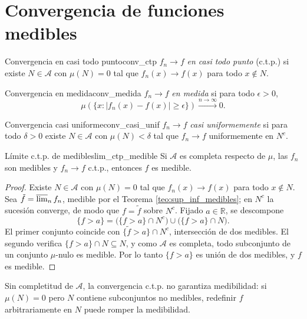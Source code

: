 \documentclass[11pt, a4paper]{article}
\begin{document}
\newpage

\section{Convergencia de funciones medibles}

\begin{definicion}{Convergencia en casi todo punto}{conv_ctp}
$f_n \to f$ \emph{en casi todo punto} (c.t.p.) si existe $N \in \mathcal{A}$ con
$\mu(N) = 0$ tal que $f_n(x) \to f(x)$ para todo $x \notin N$.
\end{definicion}

\begin{definicion}{Convergencia en medida}{conv_medida}
$f_n \to f$ \emph{en medida} si para todo $\epsilon > 0$,
$$ \mu(\{x : |f_n(x) - f(x)| \ge \epsilon\}) \xrightarrow{n \to \infty} 0. $$
\end{definicion}

\begin{definicion}{Convergencia casi uniforme}{conv_casi_unif}
$f_n \to f$ \emph{casi uniformemente} si para todo $\delta > 0$ existe $N \in \mathcal{A}$ con
$\mu(N) < \delta$ tal que $f_n \to f$ uniformemente en $N^c$.
\end{definicion}

\begin{corolario}{Límite c.t.p. de medibles}{lim_ctp_medible}
Si $\mathcal{A}$ es completa respecto de $\mu$, las $f_n$ son medibles y $f_n \to f$ c.t.p.,
entonces $f$ es medible.
\end{corolario}

\begin{proof}
Existe $N \in \mathcal{A}$ con $\mu(N) = 0$ tal que $f_n(x) \to f(x)$ para todo $x \notin N$. Sea
$\tilde f = \varlimsup_n f_n$, medible por el Teorema \ref{teo:sup_inf_medibles}; en $N^c$ la
sucesión converge, de modo que $f = \tilde f$ sobre $N^c$. Fijado $a \in \mathbb{R}$, se descompone
$$ \{f > a\} = \big(\{f > a\} \cap N^c\big) \cup \big(\{f > a\} \cap N\big). $$
El primer conjunto coincide con $\{\tilde f > a\} \cap N^c$, intersección de dos medibles. El
segundo verifica $\{f > a\} \cap N \subseteq N$, y como $\mathcal{A}$ es completa, todo subconjunto
de un conjunto $\mu$-nulo es medible. Por lo tanto $\{f > a\}$ es unión de dos medibles, y $f$ es
medible.
\end{proof}

\obs Sin completitud de $\mathcal{A}$, la convergencia c.t.p. no garantiza medibilidad: si
$\mu(N) = 0$ pero $N$ contiene subconjuntos no medibles, redefinir $f$ arbitrariamente en $N$
puede romper la medibilidad.
\end{document}
